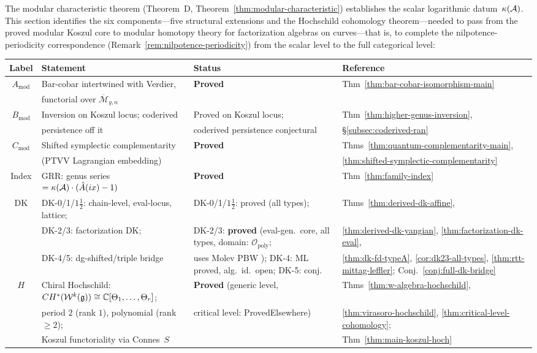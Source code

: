 The modular characteristic theorem (Theorem~D,
Theorem~\ref{thm:modular-characteristic}) establishes the scalar
logarithmic datum~$\kappa(\mathcal{A})$.  This section identifies the six
components---five structural extensions and the Hochschild
cohomology theorem---needed to pass from the proved modular Koszul
core to modular homotopy theory for factorization algebras on
curves---that is, to complete the nilpotence-periodicity
correspondence
(Remark~\ref{rem:nilpotence-periodicity}) from the scalar level to
the full categorical level:

\begin{center}
\renewcommand{\arraystretch}{1.3}
\begin{tabular}{@{}cp{4.4cm}p{3.8cm}p{4.6cm}@{}}
\toprule
\textbf{Label} & \textbf{Statement} & \textbf{Status} & \textbf{Reference} \\
\midrule
$A_{\mathrm{mod}}$ & Bar-cobar intertwined with Verdier, & \textbf{Proved} & Thm~\ref{thm:bar-cobar-isomorphism-main} \\
  & functorial over $\overline{\mathcal{M}}_{g,n}$ & & \\[2pt]
$B_{\mathrm{mod}}$ & Inversion on Koszul locus; coderived & Proved on Koszul locus; & Thm~\ref{thm:higher-genus-inversion}, \\
  & persistence off it & coderived persistence conjectural & \S\ref{subsec:coderived-ran} \\[2pt]
$C_{\mathrm{mod}}$ & Shifted symplectic complementarity & \textbf{Proved} & Thms~\ref{thm:quantum-complementarity-main}, \\
  & (PTVV Lagrangian embedding) & & \ref{thm:shifted-symplectic-complementarity} \\[2pt]
Index & GRR: genus series $= \kappa(\mathcal{A}) \cdot (\hat{A}(ix) - 1)$ & \textbf{Proved} & Thm~\ref{thm:family-index} \\[2pt]
DK & DK-0/1/$1\frac{1}{2}$: chain-level, eval-locus, lattice; & DK-0/1/$1\frac{1}{2}$: proved (all types); & Thms~\ref{thm:derived-dk-affine}, \\
  & DK-2/3: factorization DK; & DK-2/3: \textbf{proved} (eval-gen.\ core, all types, domain: $\mathcal{O}_{\mathrm{poly}}$; & \ref{thm:derived-dk-yangian}, \ref{thm:factorization-dk-eval}, \\
  & DK-4/5: dg-shifted/triple bridge & uses Molev PBW \cite{molev-yangians}); DK-4: ML proved, alg.\ id.\ open; DK-5: conj. & \ref{thm:dk-fd-typeA}, \ref{cor:dk23-all-types}, \ref{thm:rtt-mittag-leffler}; Conj.~\ref{conj:full-dk-bridge} \\[2pt]
$H$ & Chiral Hochschild: $CH^*(\mathcal{W}^k(\mathfrak{g})) \cong \mathbb{C}[\Theta_1,\ldots,\Theta_r]$; & \textbf{Proved} (generic level, & Thms~\ref{thm:w-algebra-hochschild}, \\
  & period $2$ (rank $1$), polynomial (rank $\geq 2$); & critical level: ProvedElsewhere) & \ref{thm:virasoro-hochschild}, \ref{thm:critical-level-cohomology}; \\
  & Koszul functoriality via Connes~$S$ & & Thm~\ref{thm:main-koszul-hoch} \\
\bottomrule
\end{tabular}
\end{center}

